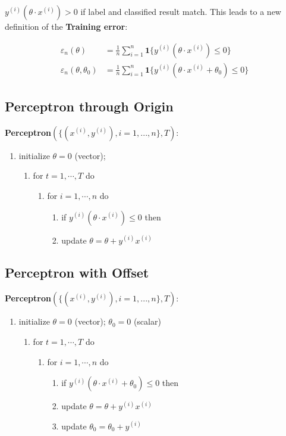 $y^{(i)}(\theta \cdot x^{(i)})>0$ if label and classified result match. This leads to a new definition of the \textbf{Training error}:

\begin{align*}
\varepsilon_n(\theta)&= \frac{1}{n} \sum_{i=1}^n \textbf{1}\{y^{(i)}(\theta \cdot x^{(i)}) \leq 0\}\\
\varepsilon_n(\theta,\theta_0)&= \frac{1}{n} \sum_{i=1}^n \textbf{1}\{y^{(i)}(\theta \cdot x^{(i)} + \theta_0) \leq 0\}
\end{align*}

\subsection{Perceptron through Origin}
\textbf{Perceptron}$\displaystyle \left(\big \{ (x^{(i)}, y^{(i)}), i=1,...,n\big \} , T \right):$
\begin{enumerate}[\indent {}]
	\item initialize  $\theta=0$ (vector);
	\begin{enumerate}[\indent {}]
		\item for $t=1,\cdots,T$ do
		\begin{enumerate}[\indent {}]
			\item for $i=1,\cdots,n$ do
			\begin{enumerate}[\indent {}]
				\item if $y^{(i)}(\theta \cdot x^{(i)})\leq 0$ then 
				\item update $\theta = \theta + y^{(i)}x^{(i)}$
			\end{enumerate}
		\end{enumerate}
	\end{enumerate}
\end{enumerate}

\subsection{Perceptron with Offset}

\textbf{Perceptron}$\displaystyle \left(\big \{ (x^{(i)}, y^{(i)}), i=1,...,n\big \} , T \right):$
\begin{enumerate}[\indent {}]
	\item initialize  $\theta=0$ (vector); $\theta_0=0$ (scalar)
	\begin{enumerate}[\indent {}]
		\item for $t=1,\cdots,T$ do
		\begin{enumerate}[\indent {}]
			\item for $i=1,\cdots,n$ do
			\begin{enumerate}[\indent {}]
				\item if $y^{(i)}(\theta \cdot x^{(i)} + \theta_0)\leq 0$ then
				\item update $\theta = \theta + y^{(i)}x^{(i)}$
				\item update $\theta_0=\theta_0 + y^{(i)}$
			\end{enumerate}
		\end{enumerate}
	\end{enumerate}
\end{enumerate}

